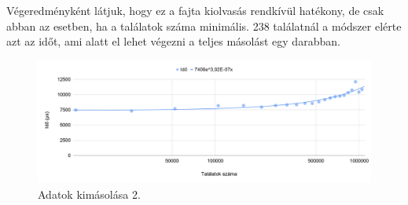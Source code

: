 Végeredményként látjuk, hogy ez a fajta kiolvasás rendkívül hatékony, de csak abban az esetben, ha a találatok száma minimális.
238 találatnál a módszer elérte azt az időt, ami alatt el lehet végezni a teljes másolást egy darabban.
\begin{figure}[h!]
\centering
\includegraphics[width=\textwidth]{images/outpuffer3.png}
\caption{Adatok kimásolása 2.}
\label{fig:schema}
\end{figure}


